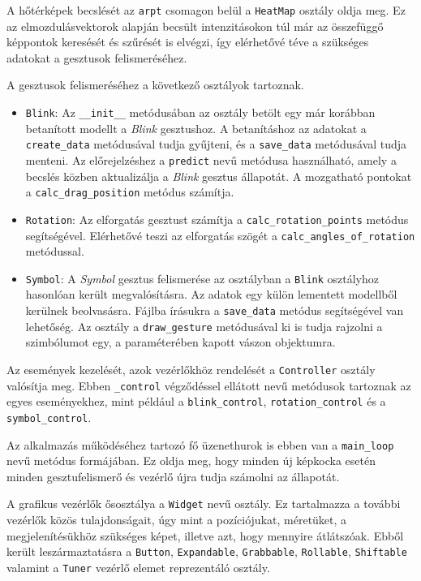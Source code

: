 A hőtérképek becslését az \texttt{arpt} csomagon belül a \texttt{HeatMap} osztály oldja meg. Ez az elmozdulásvektorok alapján becsült intenzitásokon túl már az összefüggő képpontok keresését és szűrését is elvégzi, így elérhetővé téve a szükséges adatokat a gesztusok felismeréséhez.


A gesztusok felismeréséhez a következő osztályok tartoznak.
\begin{itemize}
\item \texttt{Blink}: Az \texttt{\_\_init\_\_} metódusában az osztály betölt egy már korábban betanított modellt a \textit{Blink} gesztushoz. A betanításhoz az adatokat a \texttt{create\_data} metódusával tudja gyűjteni, és a \texttt{save\_data} metódusával tudja menteni. Az előrejelzéshez a \texttt{predict} nevű metódusa használható, amely a becslés közben aktualizálja a \textit{Blink} gesztus állapotát. A mozgatható pontokat a \texttt{calc\_drag\_position} metódus számítja.
\item \texttt{Rotation}: Az elforgatás gesztust számítja a \texttt{calc\_rotation\_points} metódus segítségével. Elérhetővé teszi az elforgatás szögét a \texttt{calc\_angles\_of\_rotation} metódussal.
\item \texttt{Symbol}: A \textit{Symbol} gesztus felismerése az osztályban a \texttt{Blink} osztályhoz hasonlóan került megvalósításra. Az adatok egy külön lementett modellből kerülnek beolvasásra. Fájlba írásukra a \texttt{save\_data} metódus segítségével van lehetőség. Az osztály a \texttt{draw\_gesture} metódusával ki is tudja rajzolni a szimbólumot egy, a paraméterében kapott vászon objektumra.
\end{itemize}


Az események kezelését, azok vezérlőkhöz rendelését a \texttt{Controller} osztály valósítja meg. Ebben \texttt{\_control} végződéssel ellátott nevű metódusok tartoznak az egyes eseményekhez, mint például a \texttt{blink\_control}, \texttt{rotation\_control} és a \texttt{symbol\_control}.

Az alkalmazás működéséhez tartozó fő üzenethurok is ebben van a \texttt{main\_loop} nevű metódus formájában. Ez oldja meg, hogy minden új képkocka esetén minden gesztufelismerő és vezérlő újra tudja számolni az állapotát.


A grafikus vezérlők ősosztálya a \texttt{Widget} nevű osztály. Ez tartalmazza a további vezérlők közös tulajdonságait, úgy mint a pozíciójukat, méretüket, a megjelenítésükhöz szükséges képet, illetve azt, hogy mennyire átlátszóak. Ebből került leszármaztatásra a \texttt{Button}, \texttt{Expandable}, \texttt{Grabbable}, \texttt{Rollable}, \texttt{Shiftable} valamint a \texttt{Tuner} vezérlő elemet reprezentáló osztály.

